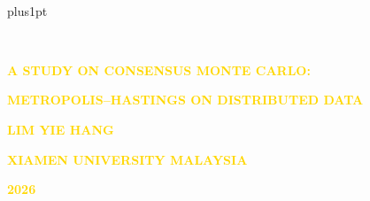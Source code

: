 \documentclass[12pt]{xmumthesis}
\title{ \thesistitleaupper\\[0.5ex]\thesistitlebupper \\[0.5ex] \thesistitlecupper  }
\newcommand{\studentname}{Lim Yie Hang}%
\newcommand{\thesisyear}{2026}%
\newcommand{\thesistitlea}{A STUDY ON CONSENSUS MONTE CARLO:}%
\newcommand{\thesistitleb}{METROPOLIS--HASTINGS ON DISTRIBUTED DATA}%
\newcommand{\thesistitlec}{\!}%
\newcommand{\studentnameupper}{\expandafter\MakeUppercase
                           \expandafter{\studentname}}
\newcommand{\thesistitleaupper}{\expandafter\MakeUppercase
                           \expandafter{\thesistitlea}}
\newcommand{\thesistitlebupper}{\expandafter\MakeUppercase
                           \expandafter{\thesistitleb}}
\newcommand{\thesistitlecupper}{\expandafter\MakeUppercase
                           \expandafter{\thesistitlec}}
\begin{document}
\baselineskip=20pt plus1pt

\setcounter{secnumdepth}{3}
\setcounter{tocdepth}{3}
\begin{coverpage}

~\vspace{2cm}
\begin{center}
{\fontsize{18}{21}\selectfont \textcolor{gold}{  {\bfseries {\thesistitleaupper}} }

\vspace{0.3cm}
  \textcolor{gold}{  {\bfseries {\thesistitlebupper}} }
\vspace{0.3cm}

 \textcolor{gold}{  {\bfseries {\thesistitlecupper}} }
\vspace{6cm}

\textcolor{gold}{{ \bfseries{\studentnameupper}}}

\vspace{7cm}
 \textcolor{gold}{  {\bfseries {XIAMEN UNIVERSITY MALAYSIA}} }
\vspace{0.3cm}

 \textcolor{gold}{  {\bfseries {\thesisyear}} }
}
\end{center}
\end{coverpage}
\pagecolor{white}
 
\maketitle
\end{document}
